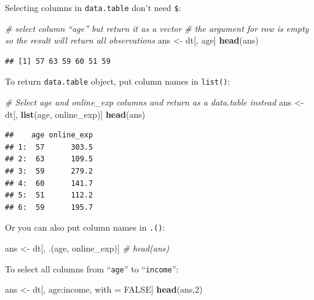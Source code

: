 \documentclass[12pt,]{krantz}
\newenvironment{Shaded}{\begin{snugshade}}{\end{snugshade}}
\newcommand{\KeywordTok}[1]{\textcolor[rgb]{0.13,0.29,0.53}{\textbf{{#1}}}}
\newcommand{\DecValTok}[1]{\textcolor[rgb]{0.00,0.00,0.81}{{#1}}}
\newcommand{\StringTok}[1]{\textcolor[rgb]{0.31,0.60,0.02}{{#1}}}
\newcommand{\CommentTok}[1]{\textcolor[rgb]{0.56,0.35,0.01}{\textit{{#1}}}}
\newcommand{\OtherTok}[1]{\textcolor[rgb]{0.56,0.35,0.01}{{#1}}}
\newcommand{\NormalTok}[1]{{#1}}
\theoremstyle{definition}
\theoremstyle{definition}
\theoremstyle{remark}
\begin{document}
Selecting columns in \texttt{data.table} don't need \texttt{\$}:

\begin{Shaded}
\begin{Highlighting}[]
\CommentTok{# select column “age” but return it as a vector}
\CommentTok{# the argument for row is empty so the result will return all observations}
\NormalTok{ans <-}\StringTok{ }\NormalTok{dt[, age]}
\KeywordTok{head}\NormalTok{(ans)}
\end{Highlighting}
\end{Shaded}

\begin{verbatim}
## [1] 57 63 59 60 51 59
\end{verbatim}

To return \texttt{data.table} object, put column names in
\texttt{list()}:

\begin{Shaded}
\begin{Highlighting}[]
\CommentTok{# Select age and online_exp columns and return as a data.table instead}
\NormalTok{ans <-}\StringTok{ }\NormalTok{dt[, }\KeywordTok{list}\NormalTok{(age, online_exp)]}
\KeywordTok{head}\NormalTok{(ans)}
\end{Highlighting}
\end{Shaded}

\begin{verbatim}
##    age online_exp
## 1:  57      303.5
## 2:  63      109.5
## 3:  59      279.2
## 4:  60      141.7
## 5:  51      112.2
## 6:  59      195.7
\end{verbatim}

Or you can also put column names in \texttt{.()}:

\begin{Shaded}
\begin{Highlighting}[]
\NormalTok{ans <-}\StringTok{ }\NormalTok{dt[, .(age, online_exp)]}
\CommentTok{# head(ans)}
\end{Highlighting}
\end{Shaded}

To select all columns from ``\texttt{age}'' to ``\texttt{income}'':

\begin{Shaded}
\begin{Highlighting}[]
\NormalTok{ans <-}\StringTok{ }\NormalTok{dt[, age:income, with =}\StringTok{ }\OtherTok{FALSE}\NormalTok{]}
\KeywordTok{head}\NormalTok{(ans,}\DecValTok{2}\NormalTok{)}
\end{Highlighting}
\end{Shaded}
\end{document}
